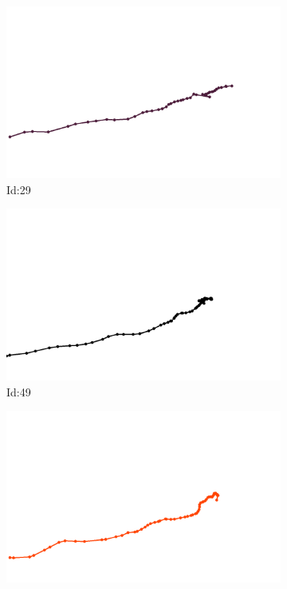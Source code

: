 \documentclass[12pt,twoside]{report}
\begin{document}
\begin{figure}
\centering
\begin{subfigure}[b]{0.20\textwidth}
\centering
\includegraphics[width=\textwidth]{../../trajectories/29.png}
\caption{Id:29}
\end{subfigure}
\begin{subfigure}[b]{0.20\textwidth}
\centering
\includegraphics[width=\textwidth]{../../trajectories/49.png}
\caption{Id:49}
\end{subfigure}
\begin{subfigure}[b]{0.20\textwidth}
\centering
\includegraphics[width=\textwidth]{../../trajectories/160.png}

\end{subfigure}
\end{figure}
\end{document}
